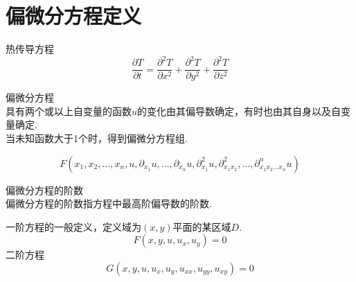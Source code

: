 \section{偏微分方程定义}
热传导方程
	\begin{equation}
		\frac{\partial T}{\partial t} = \frac{\partial^2 T}{\partial x^2} + \frac{\partial^2 T}{\partial y^2} + \frac{\partial^2 T}{\partial z^2}
	\end{equation}

	\begin{mydef}
		偏微分方程\\
		具有两个或以上自变量的函数$u$的变化由其偏导数确定，有时也由其自身以及自变量确定.
		\\
		当未知函数大于1个时，得到偏微分方程组.
	\end{mydef}
	\begin{equation}
		F(x_1,x_2,\ldots,x_n,u,\partial_{x_1} u, \ldots, \partial_{x_n} u, \partial_{x_1}^2 u, \partial_{x_1 x_2}^2,\ldots, \partial_{x_1 x_2 \ldots x_n}^n u)
	\end{equation}

	\begin{mydef}
		偏微分方程的阶数\\
		偏微分方程的阶数指方程中最高阶偏导数的阶数.
	\end{mydef}

	
一阶方程的一般定义，定义域为$(x,y)$平面的某区域$D$.
	\begin{equation}
		F(x,y,u,u_x,u_y) = 0
	\end{equation}
二阶方程
	\begin{equation}
		G(x,y,u,u_x,u_y,u_{xx},u_{yy},u_{xy}) = 0
	\end{equation}
	
